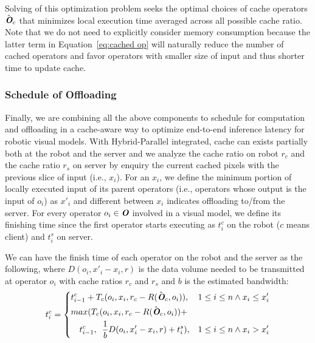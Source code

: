 Solving of this optimization problem seeks the optimal choices of cache operators $\hat{\textit{\textbf{O}}}_c$ that minimizes local execution time averaged across all possible cache ratio.
Note that we do not need to explicitly consider memory consumption because the latter term in Equation~\ref{eq:cached op} will naturally reduce the number of cached operators and favor operators with smaller size of input and thus shorter time to update cache.

\subsubsection{Schedule of Offloading\label{sec:schedule}}
Finally, we are combining all the above components to schedule for computation and offloading in a cache-aware way to optimize end-to-end inference latency for robotic visual models.
With Hybrid-Parallel integrated, cache can exists partially both at the robot and the server and we analyze the cache ratio on robot $r_c$ and the cache ratio $r_s$ on server by enquiry the current cached pixels with the previous slice of input (i.e., $x_i$).
For an $x_i$, we define the minimum portion of locally executed input of its parent operators (i.e., operators whose output is the input of $o_i$) as $x'_i$ and different between $x_i$ indicates offloading to/from the server.
For every operator $o_i \in \textit{\textbf{O}}$ involved in a visual model, we define its finishing time since the first operator starts executing as $t_i^{c}$ on the robot ($c$ means client) and $t_i^{s}$ on server.

We can have the finish time of each operator on the robot and the server as the following, where $D(o_i, x'_i-x_i,r)$ is the data volume needed to be transmitted at operator $o_i$ with cache ratios $r_c$ and $r_s$ and $b$ is the estimated bandwidth:
\begin{equation*}
    t_i^{c} = \left\{
        \begin{aligned}
            &t_{i-1}^{c} + T_c(o_i, x_i, r_c-R(\hat{\textit{\textbf{O}}}_c, o_i)),&&1\le i\le n \land x_i\le x'_i \\
            &max(T_c(o_i, x_i, r_c-R(\hat{\textit{\textbf{O}}}_c, o_i)) +\\
            & \enspace \enspace t_{i-1}^{c}, \enspace \frac{1}{b}D(o_i, x'_i-x_i,r)+ t_i^{s}),&&1\le i\le n \land x_i >x'_i
        \end{aligned}
    \right.
\end{equation*}

